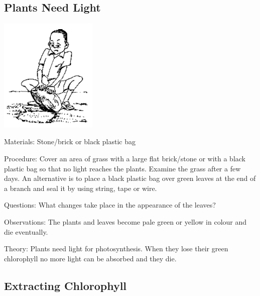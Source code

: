 \begin{multicols}{2}
\subsection{Plants Need Light} %

\begin{center}
\includegraphics[width=0.35\textwidth]{./img/source/plants-light.png}
\end{center}

\begin{description*}
\item[Materials:]{Stone/brick or black plastic bag}
\item[Procedure:]{Cover an area of grass with a large flat brick/stone or with a black plastic bag so that no
light reaches the plants. Examine the grass after a few days. An alternative is to place a black
plastic bag over green leaves at the end of a branch and seal it by using string, tape or wire.}
\item[Questions:]{What changes take place in the appearance of the leaves?}
\item[Observations:]{The plants and leaves become pale green or yellow in colour and die eventually.}
\item[Theory:]{Plants need light for photosynthesis. When they lose their green chlorophyll no more light
can be absorbed and they die.}
\end{description*}

\subsection{Extracting Chlorophyll}  %


\end{multicols}
